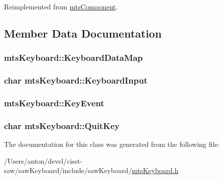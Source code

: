 Reimplemented from \hyperlink{classmts_component_aaf28f0262b44eb6866e10089a02fa6e4}{mts\+Component}.



\subsection{Member Data Documentation}
\hypertarget{classmts_keyboard_acb0628dad536242f1253245106a1e71f}{}
\subsubsection[{Keyboard\+Data\+Map}]{ mts\+Keyboard\+::\+Keyboard\+Data\+Map\hspace{0.3cm}{\ttfamily [protected]}}\label{classmts_keyboard_acb0628dad536242f1253245106a1e71f}
\hypertarget{classmts_keyboard_a23ecc71912ee8cf5f722a93a1a29613e}{}
\subsubsection[{Keyboard\+Input}]{\setlength{\rightskip}{0pt plus 5cm}char mts\+Keyboard\+::\+Keyboard\+Input\hspace{0.3cm}{\ttfamily [protected]}}\label{classmts_keyboard_a23ecc71912ee8cf5f722a93a1a29613e}
\hypertarget{classmts_keyboard_afdd1b226b01e8d9da4c14b83c7c61b82}{}
\subsubsection[{Key\+Event}]{ mts\+Keyboard\+::\+Key\+Event\hspace{0.3cm}{\ttfamily [protected]}}\label{classmts_keyboard_afdd1b226b01e8d9da4c14b83c7c61b82}
\hypertarget{classmts_keyboard_a46f3784b9176a49b7782d927a0cea892}{}
\subsubsection[{Quit\+Key}]{\setlength{\rightskip}{0pt plus 5cm}char mts\+Keyboard\+::\+Quit\+Key\hspace{0.3cm}{\ttfamily [protected]}}\label{classmts_keyboard_a46f3784b9176a49b7782d927a0cea892}


The documentation for this class was generated from the following file\+:\begin{DoxyCompactItemize}
\item 
/\+Users/anton/devel/cisst-\/saw/saw\+Keyboard/include/saw\+Keyboard/\hyperlink{mts_keyboard_8h}{mts\+Keyboard.\+h}\end{DoxyCompactItemize}
